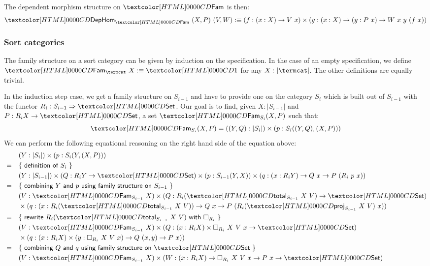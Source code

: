 The dependent morphism structure on $\Fam$ is then:
$$
\DepHom_{\Fam}\ (X , P)\ (V , W) \ddefeq (f : (x : X) \to V\ x) \times (g : (x : X) \to (y : P\ x) \to W\ x\ y\ (f\ x))
$$
%
%
\subsubsection{Sort categories}

The family structure on a sort category can be given by induction on
the specification. In the case of an empty specification, we define
$\Fam_{\termcat}\ X \ddefeq \unitty$ for any $X : | \termcat |$. The
other definitions are equally trivial.

In the induction step case, we get a family structure on $S_{i-1}$ and
have to provide one on the category $S_i$ which is built out of
$S_{i-1}$ with the functor $R_i : \Func{S_{i-1}}{\Set}$. Our goal is
to find, given $X : | S_{i-1} |$ and $P : R_i X \to \Set$, a set
$\Fam_{S_i} (X, P)$ such that:
$$
\Fam_{S_i} (X, P) = ((Y , Q) : | S_i |) \times (p : S_i((Y,Q),(X,P)))
$$
We can perform the following equational reasoning on the right hand
side of the equation above:
\begin{align*}
  &&&(Y : | S_i |) \times (p : S_i(Y,(X,P))) \\
  &=& &\reasontext{definition of $S_i$} \\
  &&&(Y : | S_{i-1} |) \times (Q : R_i Y \to \Set) \times (p : S_{i-1}(Y,X)) \times (q : (x : R_i Y) \to Q\ x \to P\ (R_i\ p\ x)) \\
  &=& &\reasontext{combining $Y$ and $p$ using family structure on $S_{i-1}$} \\
  &&&(V : \Fam_{S_{i-1}}\ X) \times (Q : R_i (\total_{S_{i-1}}\ X\ V) \to \Set) \\
  &&&\times (q : (x : R_i (\total_{S_{i-1}}\ X\ V)) \to Q\ x \to P\ (R_i (\proj_{S_{i-1}}\ X\ V)\ x)) \\
  &=& &\reasontext{rewrite $R_i (\total_{S_{i-1}}\ X\ V)$ with $\Box_{R_i}$} \\
  &&&(V : \Fam_{S_{i-1}}\ X) \times (Q : (x : R_i X) \times \Box_{R_i}\ X\ V\ x \to \Set) \\
  &&&\times (q : (x : R_i X) \times (y : \Box_{R_i}\ X\ V\ x) \to Q\ (x , y) \to P\ x)) \\
  &=& &\reasontext{combining $Q$ and $q$ using family structure on $\Set$} \\
  &&&(V : \Fam_{S_{i-1}} X) \times (W : (x : R_i X) \to \Box_{R_i}\ X\ V\ x \to P\ x \to \Set)
\end{align*}

